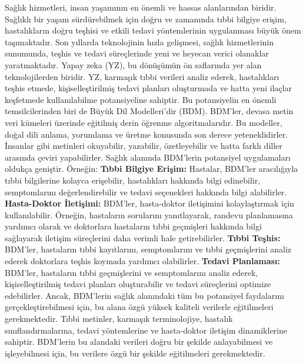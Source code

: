 
Sağlık hizmetleri, insan yaşamının en önemli ve hassas alanlarından biridir. Sağlıklı bir yaşam sürdürebilmek için doğru ve zamanında tıbbi bilgiye erişim, hastalıkların doğru teşhisi ve etkili tedavi yöntemlerinin uygulanması büyük önem taşımaktadır. Son yıllarda teknolojinin hızla gelişmesi, sağlık hizmetlerinin sunumunda, teşhis ve tedavi süreçlerinde yeni ve heyecan verici olanaklar yaratmaktadır. Yapay zeka (YZ), bu dönüşümün ön saflarında yer alan teknolojilerden biridir. YZ, karmaşık tıbbi verileri analiz ederek, hastalıkları teşhis etmede, kişiselleştirilmiş tedavi planları oluşturmada ve hatta yeni ilaçlar keşfetmede kullanılabilme potansiyeline sahiptir.
\linebreak
Bu potansiyelin en önemli temsilcilerinden biri de Büyük Dil Modelleri'dir (BDM). BDM'ler, devasa metin veri kümeleri üzerinde eğitilmiş derin öğrenme algoritmalarıdır. Bu modeller, doğal dili anlama, yorumlama ve üretme konusunda son derece yeteneklidirler. İnsanlar gibi metinleri okuyabilir, yazabilir, özetleyebilir ve hatta farklı diller arasında çeviri yapabilirler.
\linebreak
Sağlık alanında BDM'lerin potansiyel uygulamaları oldukça geniştir. Örneğin:
\linebreak
\textbf{Tıbbi Bilgiye Erişim:} Hastalar, BDM'ler aracılığıyla tıbbi bilgilerine kolayca erişebilir, hastalıkları hakkında bilgi edinebilir, semptomlarını değerlendirebilir ve tedavi seçenekleri hakkında bilgi alabilirler.
\linebreak
\textbf{Hasta-Doktor İletişimi:} BDM'ler, hasta-doktor iletişimini kolaylaştırmak için kullanılabilir. Örneğin, hastaların sorularını yanıtlayarak, randevu planlamasına yardımcı olarak ve doktorlara hastaların tıbbi geçmişleri hakkında bilgi sağlayarak iletişim süreçlerini daha verimli hale getirebilirler.
\linebreak
\textbf{Tıbbi Teşhis:} BDM'ler, hastaların tıbbi kayıtlarını, semptomlarını ve tıbbi geçmişlerini analiz ederek doktorlara teşhis koymada yardımcı olabilirler.
\textbf{Tedavi Planlaması:} BDM'ler, hastaların tıbbi geçmişlerini ve semptomlarını analiz ederek, kişiselleştirilmiş tedavi planları oluşturabilir ve tedavi süreçlerini optimize edebilirler.
\linebreak
Ancak, BDM'lerin sağlık alanındaki tüm bu potansiyel faydalarını gerçekleştirebilmesi için, bu alana özgü yüksek kaliteli verilerle eğitilmeleri gerekmektedir. Tıbbi metinler, karmaşık terminolojiye, hastalık sınıflandırmalarına, tedavi yöntemlerine ve hasta-doktor iletişim dinamiklerine sahiptir. BDM'lerin bu alandaki verileri doğru bir şekilde anlayabilmesi ve işleyebilmesi için, bu verilere özgü bir şekilde eğitilmeleri gerekmektedir.
